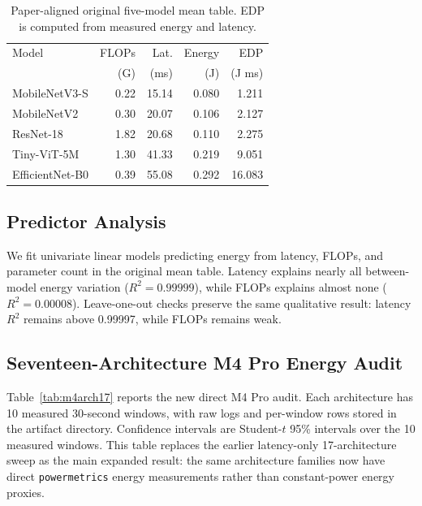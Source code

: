 \documentclass[conference]{IEEEtran}
\begin{document}
\begin{table}[t]
\centering
\caption{Paper-aligned original five-model mean table. EDP is computed from
measured energy and latency.}
\label{tab:original}
\begin{tabular}{lrrrr}
\toprule
Model & FLOPs & Lat. & Energy & EDP \\
 & (G) & (ms) & (J) & (J ms) \\
\midrule
MobileNetV3-S & 0.22 & 15.14 & 0.080 & 1.211 \\
MobileNetV2 & 0.30 & 20.07 & 0.106 & 2.127 \\
ResNet-18 & 1.82 & 20.68 & 0.110 & 2.275 \\
Tiny-ViT-5M & 1.30 & 41.33 & 0.219 & 9.051 \\
EfficientNet-B0 & 0.39 & 55.08 & 0.292 & 16.083 \\
\bottomrule
\end{tabular}
\end{table}

\subsection{Predictor Analysis}

We fit univariate linear models predicting energy from latency, FLOPs, and
parameter count in the original mean table. Latency explains nearly all
between-model energy variation ($R^2=0.99999$), while FLOPs explains almost
none ($R^2=0.00008$). Leave-one-out checks preserve the same qualitative
result: latency $R^2$ remains above 0.99997, while FLOPs remains weak.

\subsection{Seventeen-Architecture M4 Pro Energy Audit}

Table~\ref{tab:m4arch17} reports the new direct M4 Pro audit. Each architecture
has 10 measured 30-second windows, with raw logs and per-window rows stored in
the artifact directory. Confidence intervals are Student-$t$ 95\% intervals
over the 10 measured windows. This table replaces the earlier latency-only
17-architecture sweep as the main expanded result: the same architecture
families now have direct \texttt{powermetrics} energy measurements rather than
constant-power energy proxies.
\end{document}
